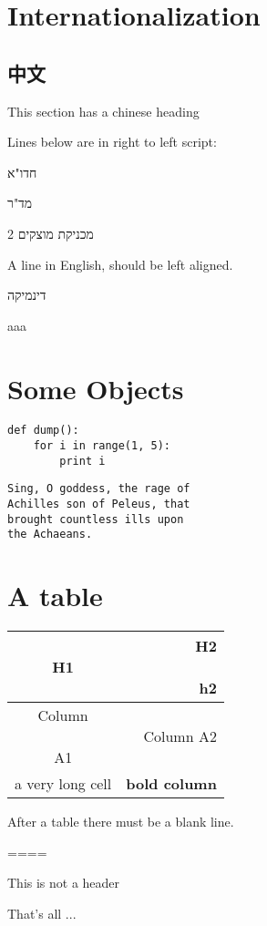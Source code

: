 \section{Internationalization}



\subsection{中文}

This section has a chinese heading



Lines below are in right to left script:



חדו"א

מד"ר

מכניקת מוצקים 2

A line in English, should be left aligned.

דינמיקה



aaa





\section{Some Objects}




\begin{lstlisting}
def dump():
	for i in range(1, 5):
		print i

\end{lstlisting}





\begin{lstlisting}
Sing, O goddess, the rage of
Achilles son of Peleus, that
brought countless ills upon
the Achaeans.

\end{lstlisting}


\section{A table}

\begin{tabular}{ |c|r| }
\hline
 H1 & \shortstack[r]{H2\\\\h2} \tabularnewline
\hline
\hline
 \shortstack[c]{Column\\\\ A1} & Column A2 \tabularnewline
\hline
 a very long cell & \textbf{bold column} \tabularnewline
\hline
\end{tabular}


After a table there must be a blank line.





====

This is not a header



That's all ...

